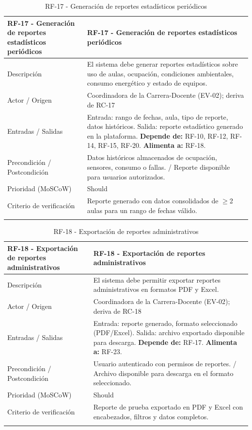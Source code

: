 \begingroup
\small
\begin{longtable}{|P{0.5000}|P{0.5000}|}
\hline
RF-17 - Generación de reportes estadísticos periódicos & RF-17 - Generación de reportes estadísticos periódicos \\ \hline
Descripción & El sistema debe generar reportes estadísticos sobre uso de aulas, ocupación, condiciones ambientales, consumo energético y estado de equipos. \\ \hline
Actor / Origen & Coordinadora de la Carrera-Docente (EV-02); deriva de RC-17 \\ \hline
Entradas / Salidas & Entrada: rango de fechas, aula, tipo de reporte, datos históricos. Salida: reporte estadístico generado en la plataforma. \textbf{Depende de:} RF-10, RF-12, RF-14, RF-15, RF-20. \textbf{Alimenta a:} RF-18. \\ \hline
Precondición / Postcondición & Datos históricos almacenados de ocupación, sensores, consumo o fallas. / Reporte disponible para usuarios autorizados. \\ \hline
Prioridad (MoSCoW) & Should \\ \hline
Criterio de verificación & Reporte generado con datos consolidados de $\geq$2 aulas para un rango de fechas válido. \\ \hline
\caption{RF-17 - Generación de reportes estadísticos periódicos}
\end{longtable}
\endgroup

\begingroup
\small
\begin{longtable}{|P{0.5000}|P{0.5000}|}
\hline
RF-18 - Exportación de reportes administrativos & RF-18 - Exportación de reportes administrativos \\ \hline
Descripción & El sistema debe permitir exportar reportes administrativos en formatos PDF y Excel. \\ \hline
Actor / Origen & Coordinadora de la Carrera-Docente (EV-02); deriva de RC-18 \\ \hline
Entradas / Salidas & Entrada: reporte generado, formato seleccionado (PDF/Excel). Salida: archivo exportado disponible para descarga. \textbf{Depende de:} RF-17. \textbf{Alimenta a:} RF-23. \\ \hline
Precondición / Postcondición & Usuario autenticado con permisos de reportes. / Archivo disponible para descarga en el formato seleccionado. \\ \hline
Prioridad (MoSCoW) & Should \\ \hline
Criterio de verificación & Reporte de prueba exportado en PDF y Excel con encabezados, filtros y datos completos. \\ \hline
\caption{RF-18 - Exportación de reportes administrativos}
\end{longtable}
\endgroup

